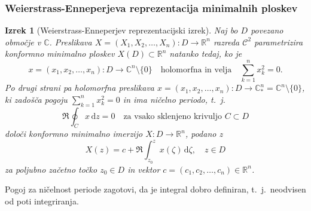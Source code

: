 \documentclass[8pt]{beamer}
\theoremstyle{definition}
\theoremstyle{remark}
\theoremstyle{plain}
\newtheorem{izrek}[definicija]{Izrek}
\numberwithin{equation}{section}  %
\begin{document}
\begin{frame}
    \frametitle{Weierstrass-Enneperjeva reprezentacija minimalnih ploskev}

    \begin{izrek}[Weierstrass-Enneperjev reprezentacijski izrek]
        Naj bo $D$ povezano območje v $\mathbb{C}$. Preslikava $X=\left(X_1, X_2, \ldots, X_n\right): D \rightarrow \mathbb{R}^n$ razreda $\mathscr{C}^2$ parametrizira konformno minimalno ploskev $X(D) \subset \mathbb{R}^n$ natanko tedaj, ko je
        \begin{equation*}
            x=\left(x_1, x_2, \ldots, x_n\right): D \rightarrow \mathbb{C}^n \setminus \{0\} \quad \text{holomorfna in velja} \quad  \sum_{k=1}^n x_k^2=0.
        \end{equation*}
        \pause 
        Po drugi strani pa holomorfna preslikava $x=\left(x_1, x_2, \ldots, x_n\right): D \rightarrow \mathbb{C}_*^n=\mathbb{C}^n \setminus\{0\}$, ki zadošča pogoju $\sum_{k=1}^nx_k^2=0$ in ima ničelno periodo, t.~j.~
        \begin{equation*}
            \Re \oint_C x \, \mathrm{d} z=0 \quad \text{za vsako sklenjeno krivuljo } C \subset D
        \end{equation*}
        določi konformno minimalno imerzijo $X: D \rightarrow \mathbb{R}^n$, podano z 
        \begin{equation*}
            X(z)=c+\Re \int_{z_0}^z x(\zeta) \, \mathrm{d} \zeta, \quad z \in D
        \end{equation*}
        za poljubno začetno točko $z_0 \in D$ in vektor $c=\left(c_1, c_2, \ldots, c_n\right) \in \mathbb{R}^n$.
    \end{izrek}
    Pogoj za ničelnost periode zagotovi, da je integral dobro definiran, t.~j.~neodvisen od poti integriranja.
    
\end{frame}
\end{document}
